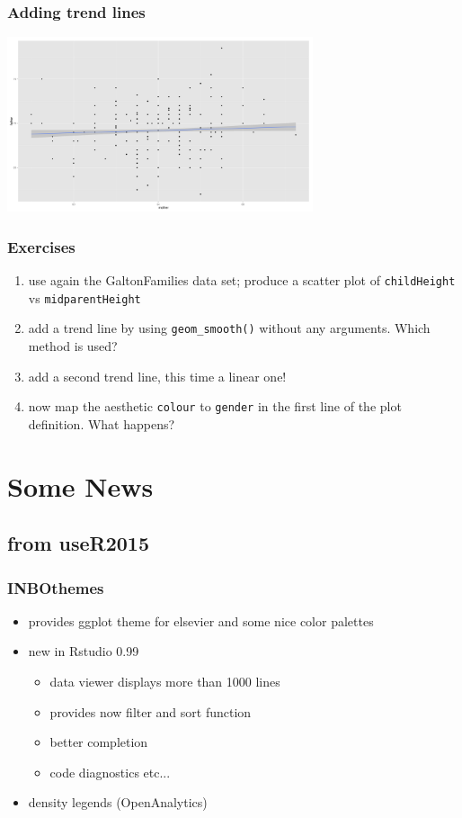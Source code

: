 \documentclass[xcolor={table}]{beamer}
\begin{document}
\begin{frame}\frametitle{Adding trend lines}
  \begin{center}
    \includegraphics[width=9cm]{scattertrend2.png}
  \end{center}
\end{frame}


\begin{frame}[allowframebreaks]\frametitle{Exercises}
  \begin{enumerate}
  \item use again the GaltonFamilies data set; produce a scatter plot of \texttt{childHeight} vs \texttt{midparentHeight}
  \item add a trend line by using \texttt{geom\_smooth()} without any arguments. Which method is used?
  \item add a second trend line, this time a linear one!
  \item now map the aesthetic \texttt{colour} to \texttt{gender} in the first line of the plot definition. What happens?
  \end{enumerate}
\end{frame}

\section{Some News}
\subsection{from useR2015}

\begin{frame}\frametitle{INBOthemes}
  \begin{itemize}
  \item provides ggplot theme for elsevier and some nice color palettes
  \item new in Rstudio 0.99
    \begin{itemize}
    \item data viewer displays more than 1000 lines
    \item provides now filter and sort function
    \item better completion
    \item code diagnostics etc...
    \end{itemize}
  \item density legends (OpenAnalytics) 
  \end{itemize}

\end{frame}
\end{document}
